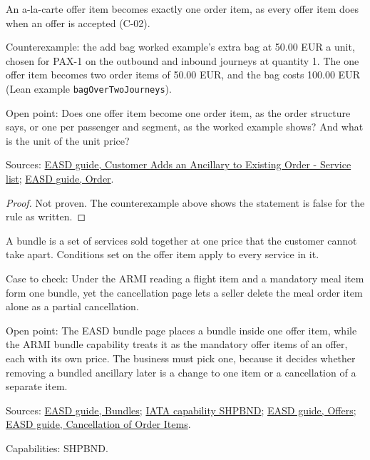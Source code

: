 \begin{theorem}
  \label{thm:ancillaries-alacarte-one-item}
  An a-la-carte offer item becomes exactly one order item, as every offer
  item does when an offer is accepted (C-02).

  Counterexample: the add bag worked example's extra bag at 50.00 EUR a
  unit, chosen for PAX-1 on the outbound and inbound journeys at quantity 1.
  The one offer item becomes two order items of 50.00 EUR, and the bag costs
  100.00 EUR (Lean example \texttt{bagOverTwoJourneys}).

  Open point: Does one offer item become one order item, as the order
  structure says, or one per passenger and segment, as the worked example
  shows?  And what is the unit of the unit price?

  Sources: \href{https://standards.atlassian.net/wiki/spaces/EASD/pages/842301531}{EASD guide, Customer Adds an Ancillary to Existing Order - Service list};
  \href{https://standards.atlassian.net/wiki/spaces/EASD/pages/574849062/Order}{EASD guide, Order}.
\end{theorem}
\begin{proof}
  Not proven.  The counterexample above shows the statement is false for the
  rule as written.
\end{proof}

\begin{definition}
  \label{def:ancillaries-bundle-meaning}
  \notready
  A bundle is a set of services sold together at one price that the customer
  cannot take apart. Conditions set on the offer item apply to every service
  in it.

  Case to check: Under the ARMI reading a flight item and a mandatory meal
  item form one bundle, yet the cancellation page lets a seller delete the
  meal order item alone as a partial cancellation.

  Open point: The EASD bundle page places a bundle inside one offer item,
  while the ARMI bundle capability treats it as the mandatory offer items of
  an offer, each with its own price. The business must pick one, because it
  decides whether removing a bundled ancillary later is a change to one item
  or a cancellation of a separate item.

  Sources: \href{https://standards.atlassian.net/wiki/spaces/EASD/pages/574619818}{EASD guide, Bundles};
  \href{https://retailing.iata.org/armi/docs/SHPBND/}{IATA capability SHPBND};
  \href{https://standards.atlassian.net/wiki/spaces/EASD/pages/600637464}{EASD guide, Offers};
  \href{https://standards.atlassian.net/wiki/spaces/EASD/pages/574783569}{EASD guide, Cancellation of Order Items}.

  Capabilities: SHPBND.
\end{definition}

